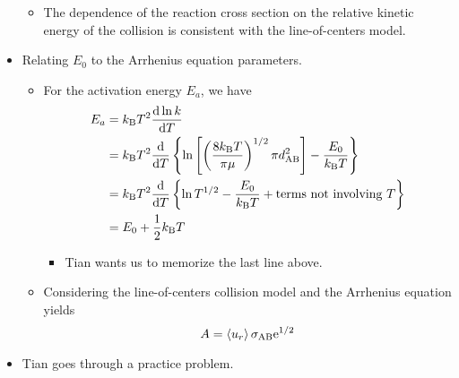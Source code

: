 \documentclass[../notes.tex]{subfiles}
\begin{document}
\begin{itemize}
    \begin{itemize}
        \item The dependence of the reaction cross section on the relative kinetic energy of the collision is consistent with the line-of-centers model.
    \end{itemize}
    \item Relating $E_0$ to the Arrhenius equation parameters.
    \begin{itemize}
        \item For the activation energy $E_a$, we have
        \begingroup
        \allowdisplaybreaks
        \begin{align*}
            E_a &= \kB T^2\dv{\ln k}{T}\\
            &= \kB T^2\dv{T}\left\{ \ln\left[ \left( \frac{8\kB T}{\pi\mu} \right)^{1/2}\pi d_{\ce{A}\ce{B}}^2 \right]-\frac{E_0}{\kB T} \right\}\\
            &= \kB T^2\dv{T}\left\{ \ln T^{1/2}-\frac{E_0}{\kB T}+\text{terms not involving }T \right\}\\
            &= E_0+\frac{1}{2}\kB T
        \end{align*}
        \endgroup
        \begin{itemize}
            \item Tian wants us to memorize the last line above.
        \end{itemize}
        \item Considering the line-of-centers collision model and the Arrhenius equation yields
        \begin{equation*}
            A = \prb{u_r}\sigma_{\ce{A}\ce{B}}\e[1/2]
        \end{equation*}
    \end{itemize}
    \item Tian goes through a practice problem.
\end{itemize}
\end{document}
